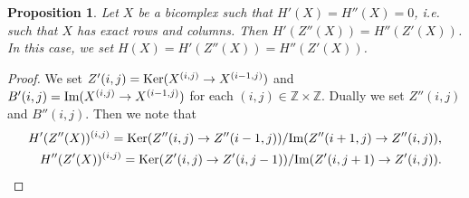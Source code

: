 \documentclass[reqno,12pt]{amsart}
\numberwithin{equation}{section}
\def\Ker{\mbox{\rm Ker}} \def\im{\mbox{\rm Im}} \def\Coker{\mbox{\rm Coker}}\def\mod{\mbox{\rm mod}}
\def\Im{\mbox{\rm Im}} \def\id{\mbox{\rm id}} \def\wid{\mbox{\rm w{\text -}id}} \def\FPid{\mbox{\rm FP{\text -}id}}
\theoremstyle{plain}
\newtheorem{proposition}[theorem]{\bf Proposition}
\theoremstyle{definition}
\begin{document}
\begin{proposition}\label{prop-4}
    Let $X$ be a bicomplex such that $H'(X)=H''(X)=0$, i.e. such that $X$ has exact rows and columns. Then $H'(Z''(X))=H''(Z'(X))$. In this case, we set $H(X)=H'(Z''(X))=H''(Z'(X))$.
\end{proposition}
\begin{proof}
    We set $Z'(i,j)=\Ker(X^{(i,j)}\to X^{(i-1,j)})$ and $B'(i,j)=\Im(X^{(i,j)}\to X^{(i-1,j)})$ for each $(i,j)\in\mathbb{Z}\times\mathbb{Z}$. Dually we set $Z''(i,j)$ and $B''(i,j)$. Then we note that \begin{align*}
    H'(Z''(X))^{(i,j)}=\Ker(Z''(i,j)\to Z''(i-1,j))/\Im(Z''(i+1,j)\to Z''(i,j)),\\
    H''(Z'(X))^{(i,j)}=\Ker(Z'(i,j)\to Z'(i,j-1))/\Im(Z'(i,j+1)\to Z'(i,j)).
    \end{align*}


\end{proof}
\end{document}
